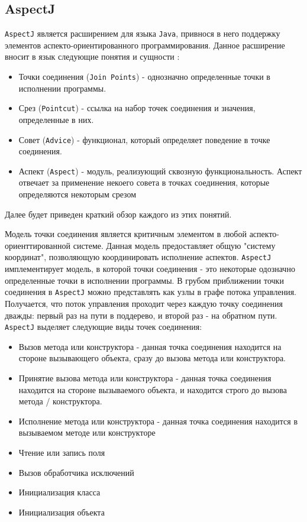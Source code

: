 \subsection{AspectJ}

\texttt{AspectJ} является расширением для языка \texttt{Java}, привнося в него поддержку элементов аспекто-ориентированного программирования. Данное расширение вносит в язык следующие понятия и сущности \cite{aspectj}:

\begin{itemize}
    \item Точки соединения (\texttt{Join~Points}) - однозначно определенные точки в исполнении программы.
    \item Срез (\texttt{Pointcut}) - ссылка на набор точек соединения и значения, определенные в них.
    \item Совет (\texttt{Advice}) - функционал, который определяет поведение в точке соединения.
    \item Аспект (\texttt{Aspect}) - модуль, реализующий сквозную функциональность. Аспект отвечает за применение некоего совета в точках соединения, которые определяются некоторым срезом
\end{itemize}

Далее будет приведен краткий обзор каждого из этих понятий.

Модель точки соединения является критичным элементом в любой аспекто-ориенттированной системе. Данная модель предоставляет общую "систему координат", позволяющую координировать исполнение аспектов. \texttt{AspectJ} имплементирует модель, в которой точки соединения - это некоторые одозначно определенные точки в исполнении программы. В грубом приближении точки соединения в \texttt{AspectJ} можно представлять как узлы в графе потока управления. Получается, что поток управления проходит через каждую точку соединения дважды: первый раз на пути в поддерево, и второй раз - на обратном пути. \texttt{AspectJ} выделяет следующие виды точек соединения:

\begin{itemize}
    \item Вызов метода или конструктора - данная точка соединения находится на стороне вызывающего объекта, сразу до вызова метода или конструктора.
    \item Принятие вызова метода или конструктора - данная точка соединения находится на стороне вызываемого объекта, и находится строго до вызова метода / конструктора.
    \item Исполнение метода или конструктора - данная точка соединения находится в вызываемом методе или конструкторе
    \item Чтение или запись поля
    \item Вызов обработчика исключений
    \item Инициализация класса
    \item Инициализация объекта
\end{itemize}

